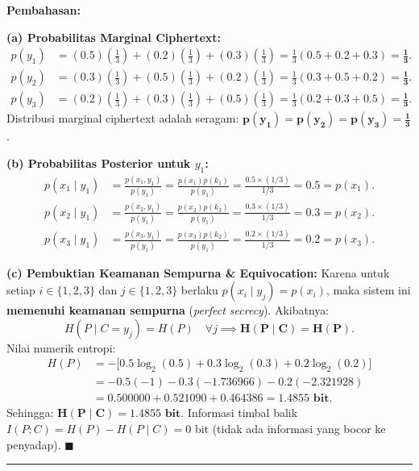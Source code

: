 \documentclass[11pt,a4paper]{article}
\newenvironment{solusi}{\noindent\textbf{\textsf{Pembahasan:}}\par\vspace{0.2em}}{\hfill$\blacksquare$\vspace{1em}\par\hrule\vspace{1em}}
\begin{document}
\begin{solusi}
\textbf{(a) Probabilitas Marginal Ciphertext:}
\begin{align*}
p(y_1) &= (0.5)\left(\frac{1}{3}\right) + (0.2)\left(\frac{1}{3}\right) + (0.3)\left(\frac{1}{3}\right) = \frac{1}{3}(0.5 + 0.2 + 0.3) = \mathbf{\frac{1}{3}}. \\
p(y_2) &= (0.3)\left(\frac{1}{3}\right) + (0.5)\left(\frac{1}{3}\right) + (0.2)\left(\frac{1}{3}\right) = \frac{1}{3}(0.3 + 0.5 + 0.2) = \mathbf{\frac{1}{3}}. \\
p(y_3) &= (0.2)\left(\frac{1}{3}\right) + (0.3)\left(\frac{1}{3}\right) + (0.5)\left(\frac{1}{3}\right) = \frac{1}{3}(0.2 + 0.3 + 0.5) = \mathbf{\frac{1}{3}}.
\end{align*}
Distribusi marginal ciphertext adalah seragam: $\mathbf{p(y_1) = p(y_2) = p(y_3) = \frac{1}{3}}$.

\vspace{0.2cm}
\textbf{(b) Probabilitas Posterior untuk $y_1$:}
\begin{align*}
p(x_1 \mid y_1) &= \frac{p(x_1, y_1)}{p(y_1)} = \frac{p(x_1)p(k_1)}{p(y_1)} = \frac{0.5 \times (1/3)}{1/3} = \mathbf{0.5} = p(x_1). \\
p(x_2 \mid y_1) &= \frac{p(x_2, y_1)}{p(y_1)} = \frac{p(x_2)p(k_3)}{p(y_1)} = \frac{0.3 \times (1/3)}{1/3} = \mathbf{0.3} = p(x_2). \\
p(x_3 \mid y_1) &= \frac{p(x_3, y_1)}{p(y_1)} = \frac{p(x_3)p(k_2)}{p(y_1)} = \frac{0.2 \times (1/3)}{1/3} = \mathbf{0.2} = p(x_3).
\end{align*}

\vspace{0.2cm}
\textbf{(c) Pembuktian Keamanan Sempurna \& Equivocation:}
Karena untuk setiap $i \in \{1, 2, 3\}$ dan $j \in \{1, 2, 3\}$ berlaku $p(x_i \mid y_j) = p(x_i)$, maka sistem ini \textbf{memenuhi keamanan sempurna} (\textit{perfect secrecy}).
Akibatnya:
\[
H(P \mid C = y_j) = H(P) \quad \forall j \implies \mathbf{H(P \mid C) = H(P)}.
\]
Nilai numerik entropi:
\begin{align*}
H(P) &= -\big[0.5 \log_2(0.5) + 0.3 \log_2(0.3) + 0.2 \log_2(0.2)\big] \\
&= -0.5(-1) - 0.3(-1.736966) - 0.2(-2.321928) \\
&= 0.500000 + 0.521090 + 0.464386 = \mathbf{1.4855 \text{ bit}}.
\end{align*}
Sehingga: $\mathbf{H(P \mid C) = 1.4855 \text{ bit}}$. Informasi timbal balik $I(P; C) = H(P) - H(P \mid C) = 0$ bit (tidak ada informasi yang bocor ke penyadap).
\end{solusi}
\end{document}
